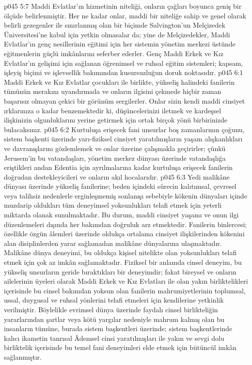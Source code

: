 \vs p045 5:7 Maddi Evlatlar’ın hizmetinin niteliği, onların çağları boyunca geniş bir ölçüde belirlenmiştir. Her ne kadar onlar, maddi bir niteliğe sahip ve genel olarak belirli gezegenler ile sınırlanmış olan bir biçimde Salvington’un Melçizedek Üniversitesi’ne kabul için yetkin olmasalar da; yine de Melçizedekler, Maddi Evlatlar’ın genç nesillerinin eğitimi için her sistemin yönetim merkezi üstünde eğitmenlerin güçlü imkânlarını seferber ederler. Genç Maddi Erkek ve Kız Evlatlar’ın gelişimi için sağlanan öğrenimsel ve ruhsal eğitim sistemleri; kapsam, işleyiş biçimi ve işlevsellik bakımından kusursuzluğun doruk noktasıdır.
\vs p045 6:1 Maddi Erkek ve Kız Evlatlar çocukları ile birlikte, yükseliş halindeki fanilerin tümünün merakını uyandırmada ve onların ilgisini çekmede hiçbir zaman başarısız olmayan çekici bir görünüm sergilerler. Onlar sizin kendi maddi cinsiyet ırklarınıza o kadar benzemektedir ki, düşüncelerinizi iletmek ve kardeşsel ilişkinizin olgunluklarını yerine getirmek için ortak birçok yönü birbirinizde bulacaksınız.
\vs p045 6:2 Kurtuluşa erişecek fani unsurlar boş zamanlarının çoğunu, sistem başkenti üzerinde yarı\hyp{}fiziksel cinsiyet yaratılmışların yaşam alışkanlıkları ve davranışlarını gözlemlemek ve onlar üzerine çalışmakla geçirirler; çünkü Jerusem’in bu vatandaşları, yönetim merkez dünyası üzerinde vatandaşlığa eriştikleri andan Edentia için ayrılmalarına kadar kurtuluşa erişecek fanilerin doğrudan destekleyicileri ve onların akıl hocalarıdır.
\vs p045 6:3 Yedi malikâne dünyası üzerinde yükseliş fanilerine; beden içindeki sürecin kalıtımsal, çevresel veya talihsiz nedenlerle erginleşmemiş sonlanışı sebebiyle kökenin dünyaları içinde muzdarip oldukları tüm deneyimsel yoksunlukları telafi etmek için yeterli miktarda olanak sunulmaktadır. Bu durum, maddi cinsiyet yaşamı ve onun ilgi düzenlemeleri dışında her bakımdan doğruluk arz etmektedir. Fanilerin binlercesi; özellikle özgün âlemleri üzerinde oldukça ortalama cinsiyet ilişkilerinden kökenini alan disiplinlerden yarar sağlamadan malikâne dünyalarına ulaşmaktadır. Malikâne dünya deneyimi, bu oldukça kişisel nitelikte olan yoksunlukları telafi etmek için çok az imkân sağlamaktadır. Fiziksel bir anlamda cinsel deneyim, bu yükseliş unsurların geride bıraktıkları bir deneyimdir; fakat bireysel ve onların ailelerinin üyeleri olarak Maddi Erkek ve Kız Evlatları ile olan yakın birliktelikleri içerisinde bu cinsel bakımdan yoksun olan fanilerin mahrumiyetlerinin toplumsal, ussal, duygusal ve ruhsal yönlerini telafi etmeleri için kendilerine yetkinlik verilmiştir. Böylelikle evrimsel dünya üzerinde faydalı cinsel birlikteliğin yararlarından şartlar veya kötü yargılar nedeniyle mahrum kalmış olan bu insanların tümüne, burada sistem başkentleri üzerinde; sistem başkentlerinde kalıcı ikametin tanrısal Âdemsel cinsi yaratılmışları ile yakın ve sevgi dolu birliktelik içerisinde bu temel fani deneyimleri elde etmek için bütüncül imkân sağlanmıştır.
